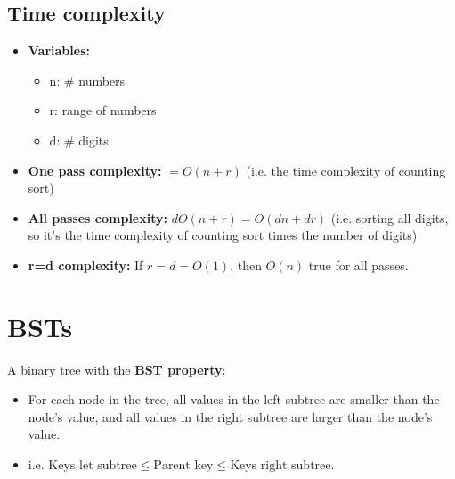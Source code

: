 \documentclass{article}
\begin{document}
\subsection{Time complexity}
\begin{definition}
    \begin{itemize}
        \item \textbf{Variables:}
        \begin{itemize}
            \item n: \# numbers 
            \item r: range of numbers 
            \item d: \# digits
        \end{itemize}

        \item \textbf{One pass complexity:} $=O(n+r)$ (i.e. the time complexity of counting sort)
        \item \textbf{All passes complexity:} $dO(n+r) = O(dn + dr)$ (i.e. sorting all digits, so it's the time complexity of counting sort times the number of digits)
        \item \textbf{r=d complexity:} If $r=d=O(1)$, then $O(n)$ true for all passes.
    \end{itemize}
\end{definition}
\newpage

\section{BSTs}
\begin{summary}
    
\end{summary}

\begin{definition}
    A binary tree with the \textbf{BST property}: 
    \begin{itemize}
        \item For each node in the tree, all values in the left subtree are smaller than the node's value, and all values in the right subtree are larger than the node's value.
        \item i.e. $\text{Keys let subtree} \leq \text{Parent key} \leq \text{Keys right subtree}$.
    \end{itemize}
\end{definition}
\end{document}
